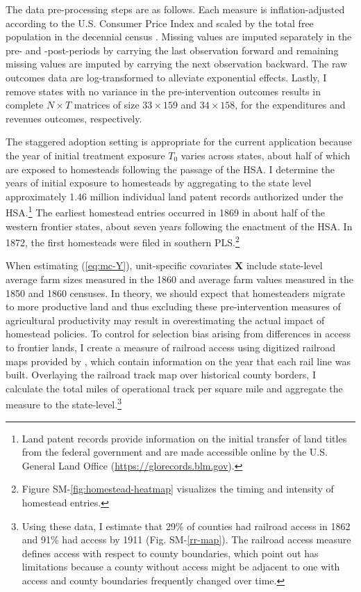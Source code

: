 \documentclass[12pt]{article}
\begin{document}
The data pre-processing steps are as follows. Each measure is inflation-adjusted according to the U.S. Consumer Price Index \citep{williamson2017seven} and scaled by the total free population in the decennial census \citep{haines2010}. Missing values are imputed separately in the pre- and -post-periods by carrying the last observation forward and remaining missing values are imputed by carrying the next observation backward. The raw outcomes data are log-transformed to alleviate exponential effects. Lastly, I remove states with no variance in the pre-intervention outcomes results in complete $N \times T$ matrices of size $33 \times 159$ and $34 \times 158$, for the expenditures and revenues outcomes, respectively. 

The staggered adoption setting is appropriate for the current application because the year of initial treatment exposure $T_0$ varies across states, about half of which are exposed to homesteads following the passage of the HSA. I determine the years of initial exposure to homesteads by aggregating to the state level approximately 1.46 million individual land patent records authorized under the HSA.\footnote{Land patent records provide information on the initial transfer of land titles from the federal government and are made accessible online by the U.S. General Land Office (\url{https://glorecords.blm.gov}).} The earliest homestead entries occurred in 1869 in about half of the western frontier states, about seven years following the enactment of the HSA. In 1872, the first homesteads were filed in southern PLS.\footnote{Figure SM-\ref{fig:homestead-heatmap} visualizes the timing and intensity of homestead entries.} 

When estimating (\ref{eq:mc-Y}), unit-specific covariates $\mathbf{X}$ include state-level average farm sizes measured in the 1860 and average farm values measured in the 1850 and 1860 censuses. In theory, we should expect that homesteaders migrate to more productive land and thus excluding these pre-intervention measures of agricultural productivity may result in overestimating the actual impact of homestead policies. To control for selection bias arising from differences in access to frontier lands, I create a measure of railroad access using digitized railroad maps provided by \citet{atack2013use}, which contain information on the year that each rail line was built. Overlaying the railroad track map over historical county borders, I calculate the total miles of operational track per square mile and aggregate the measure to the state-level.\footnote{Using these data, I estimate that 29\% of counties had railroad access in 1862 and 91\% had access by 1911 (Fig. SM-\ref{rr-map}). The railroad access measure defines access with respect to county boundaries, which \citet{atack2012impact} point out has limitations because a county without access might be adjacent to one with access and county boundaries frequently changed over time.}
\end{document}
